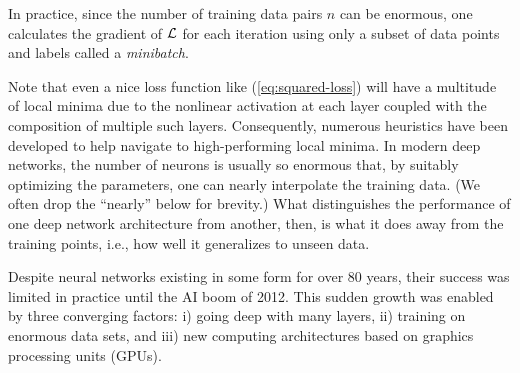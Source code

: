 \documentclass{notices}
\begin{document}
In practice, since the number of training data pairs $n$ can be enormous, one calculates the gradient of ${\cal L}$ for each iteration using only a subset of data points and labels called a {\em minibatch}.


Note that even a nice loss function like (\ref{eq:squared-loss}) will have a multitude of local minima due to the nonlinear activation at each layer coupled with the composition of multiple such layers.
Consequently, numerous heuristics have been developed to help navigate to high-performing local minima.
In modern deep networks, the number of neurons is usually so enormous that, by suitably optimizing the parameters, one can nearly interpolate the training data.
(We often drop the ``nearly'' below for brevity.)
What distinguishes the performance of one deep network architecture from another, then, is what it does away from the training points, i.e., how well it generalizes to unseen data.


Despite neural networks existing in some form for over 80 years, their success was limited in practice until the AI boom of 2012. 
This sudden growth was enabled by three converging factors: 
i) going deep with many layers, ii) training on enormous data sets, 
and iii) new computing architectures based on graphics processing units (GPUs). 
\end{document}
